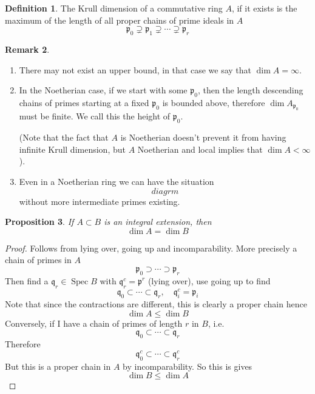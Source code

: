 \documentclass[11pt,a4paper]{article}
\theoremstyle{definition}
\newtheorem{definition}{Definition}[section]
\newtheorem{remark}[definition]{Remark}
\theoremstyle{plain}
\newtheorem{proposition}[definition]{Proposition}
\theoremstyle{remark}
\newcommand{\Spec}{\operatorname{Spec}}
\begin{document}
\begin{definition}
    The Krull dimension of a commutative ring $A$, if it exists is the maximum of the length 
    of all proper chains of prime ideals in $A$
    $$\mathfrak{p}_0 \supsetneq \mathfrak{p}_1 \supsetneq \cdots \supsetneq \mathfrak{p}_r$$ 
\end{definition}

\begin{remark}
    \begin{enumerate}
        \item There may not exist an upper bound, in that case we say that $\dim A = \infty$.  
        \item In the Noetherian case, if we start with some $\mathfrak{p}_0$, then the length descending chains of primes 
        starting at a fixed $\mathfrak{p}_0$ is bounded above, therefore $\dim A_{\mathfrak{p}_0}$ must be finite. 
        We call this the height of $\mathfrak{p}_0$. 

        (Note that the fact that $A$ is Noetherian doesn't prevent it from having infinite Krull dimension, but $A$ Noetherian and local implies that 
        $\dim A < \infty$).

        \item  Even in a Noetherian ring we can have the situation 
        $$diagrm$$
        without more intermediate primes existing.
    \end{enumerate}
\end{remark}

\begin{proposition}
    If $A \subset B$ is an integral extension, then 
    $$\dim A = \dim B$$
\end{proposition}

\begin{proof}
    Follows from lying over, going up and incomparability. More precisely a chain of primes in $A$ 
    $$\mathfrak{p}_0 \supset \cdots \supset \mathfrak{p}_r$$
    Then find a $\mathfrak{q}_r \in \Spec B$ with $\mathfrak{q}_r^c = \mathfrak{p}^r$ (lying over), use going up 
    to find 
    $$\mathfrak{q}_0 \subset \cdots \subset \mathfrak{q}_r, \quad \mathfrak{q}_i^c = \mathfrak{p}_i$$
    Note that since the contractions are different, this is clearly a proper chain hence 
    $$\dim A \le \dim B$$
    Conversely, if I have a chain of primes of length $r$ in $B$, i.e. 
    $$ \mathfrak{q}_0 \subset \cdots \subset \mathfrak{q}_r$$
    Therefore 
    $$\mathfrak{q}_0^c \subset \cdots \subset \mathfrak{q}_r^c$$
    But this is a proper chain in $A$ by incomparability. So this is gives 
    $$\dim B \le \dim A$$
\end{proof}
\end{document}
